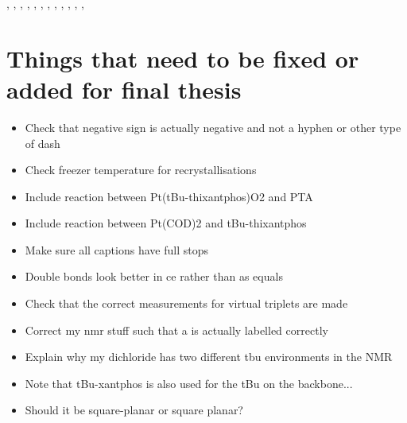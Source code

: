 ,
,
,
,
,
,
,
,
,
,
,
,

\newpage{}
\section{Things that need to be fixed or added for final thesis}
\begin{itemize}
\item{Check that negative sign is actually negative and not a hyphen or other type of dash}
\item{Check freezer temperature for recrystallisations}
\item{Include reaction between Pt(tBu-thixantphos)O2 and PTA}
\item{Include reaction between Pt(COD)2 and tBu-thixantphos}
\item{Make sure all captions have full stops}
\item{Double bonds look better in ce rather than as equals}
\item{Check that the correct measurements for virtual triplets are made}
\item{Correct my nmr stuff such that a is actually labelled correctly}
\item{Explain why my dichloride has two different tbu environments in the NMR}
\item{Note that tBu-xantphos is also used for the tBu on the backbone...}
\item{Should it be square-planar or square planar?}
\end{itemize}

\newpage{}
